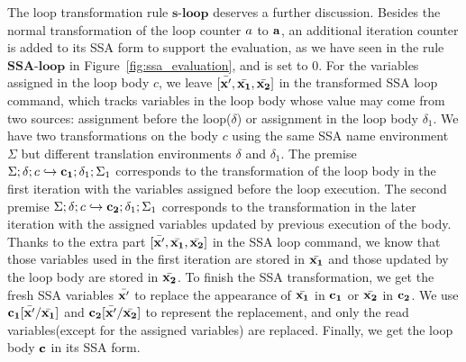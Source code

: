 The loop transformation rule $\textbf{s-loop}$ deserves a further discussion. Besides the normal transformation of the loop counter $a$ to ${\bf{{a}}}$, an additional iteration counter is added to its SSA form to support the evaluation, as we have seen in the rule $\textbf{SSA-loop}$ in Figure~\ref{fig:ssa_evaluation}, and is set to $0$.
For the variables assigned in the loop body $c$, we leave $ [\bar{{\bf{{x'}}}}, \bar{{\bf{{x_1}}}}, \bar{{\bf{{x_2}}}}]$ in the transformed SSA loop command, which tracks variables in the loop body whose value may come from two sources: assignment before the loop($\delta$) or assignment in the loop body $\delta_1$. We have two transformations on the body $c$ using the same SSA name environment $\Sigma$ but different translation environments $\delta$ and $\delta_1$.
The premise $\Sigma; \delta; c \hookrightarrow {\bf{{c_1}}}; \delta_1 ; \Sigma_1 $ corresponds to the transformation of the loop body in the first iteration with the variables assigned before the loop execution. The second premise $\Sigma; \delta; c \hookrightarrow {\bf{{c_2}}}; \delta_1 ; \Sigma_1 $ corresponds to the transformation in the later iteration with the assigned variables updated by previous execution of the body.
Thanks to the extra part $ [\bar{{\bf{{x'}}}}, \bar{{\bf{{x_1}}}}, \bar{{\bf{{x_2}}}}]$ in the SSA loop command, we know that those variables used in the first iteration are stored in $\bar{{\bf{{x_1}}}}$ and those updated by the loop body are stored in $\bar{{\bf{{x_2}}}}$. To finish the SSA transformation, we get the fresh SSA variables $\bar{{\bf{{x'}}}}$ to replace the appearance of $\bar{{\bf{{x_1}}}}$ in  ${\bf{{c_1}}}$ or $\bar{{\bf{{x_2}}}}$ in ${\bf{{c_2}}}$. We use ${\bf{{c_1}}}[\bar{{\bf{{x'}}}}/ \bar{{\bf{{x_1}}}}]$ and ${\bf{{c_2}}}[\bar{{\bf{{x'}}}}/ \bar{{\bf{{x_2}}}}]$ to represent the replacement, and only the read variables(except for the assigned variables) are replaced. 
Finally, we get the loop body ${\bf{{c}}}$ in its SSA form.
